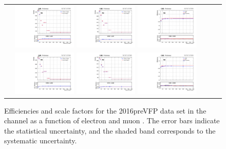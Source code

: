 \begin{figure}[!htb]
  \begin{center}
    \begin{tabular}{ccc}
      \includegraphics[width=0.30\textwidth]{fig_2016preVFP_TrigSF/g_lepApt_emu_MC.pdf}
      \includegraphics[width=0.30\textwidth]{fig_2016preVFP_TrigSF/g_lepApt_emu_data.pdf}
      \includegraphics[width=0.30\textwidth]{fig_2016preVFP_TrigSF/g_emu_lepApt_FullSystUncBand.pdf}\\
      \includegraphics[width=0.30\textwidth]{fig_2016preVFP_TrigSF/g_lepBpt_emu_MC.pdf}
      \includegraphics[width=0.30\textwidth]{fig_2016preVFP_TrigSF/g_lepBpt_emu_data.pdf}
      \includegraphics[width=0.30\textwidth]{fig_2016preVFP_TrigSF/g_emu_lepBpt_FullSystUncBand.pdf}\\
    \end{tabular}
    \caption{Efficiencies and scale factors for the 2016preVFP data set in the \emu channel as a function of electron and muon \pT.
            The error bars indicate the statistical uncertainty, and the shaded band corresponds to the systematic uncertainty.
            }
    \label{TrigSF_2016preVFP_1}
  \end{center}
\end{figure}

